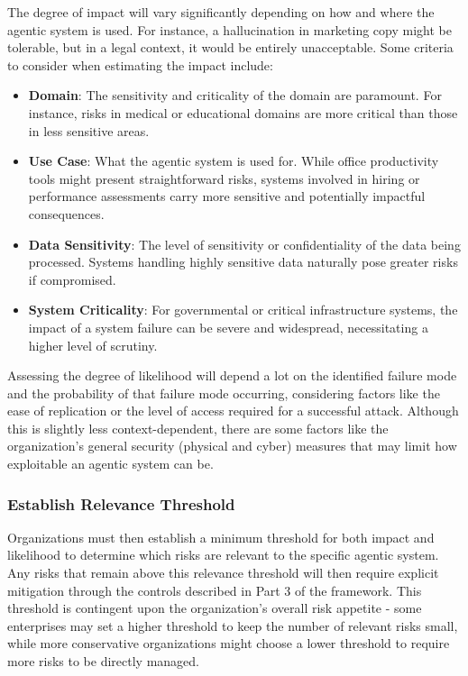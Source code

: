 \documentclass{article}
\begin{document}
The degree of impact will vary significantly depending on how and where the agentic system is used. For instance, a hallucination in marketing copy might be tolerable, but in a legal context, it would be entirely unacceptable. Some criteria to consider when estimating the impact include:

\begin{itemize}
    \item \textbf{Domain}: The sensitivity and criticality of the domain are paramount. For instance, risks in medical or educational domains are more critical than those in less sensitive areas.
    \item \textbf{Use Case}: What the agentic system is used for. While office productivity tools might present straightforward risks, systems involved in hiring or performance assessments carry more sensitive and potentially impactful consequences.
    \item \textbf{Data Sensitivity}: The level of sensitivity or confidentiality of the data being processed. Systems handling highly sensitive data naturally pose greater risks if compromised.
    \item \textbf{System Criticality}: For governmental or critical infrastructure systems, the impact of a system failure can be severe and widespread, necessitating a higher level of scrutiny.
\end{itemize}

Assessing the degree of likelihood will depend a lot on the identified failure mode and the probability of that failure mode occurring, considering factors like the ease of replication or the level of access required for a successful attack. Although this is slightly less context-dependent, there are some factors like the organization’s general security (physical and cyber) measures that may limit how exploitable an agentic system can be.

\subsubsection{Establish Relevance Threshold}

Organizations must then establish a minimum threshold for both impact and likelihood to determine which risks are relevant to the specific agentic system. Any risks that remain above this relevance threshold will then require explicit mitigation through the controls described in Part 3 of the framework. This threshold is contingent upon the organization's overall risk appetite - some enterprises may set a higher threshold to keep the number of relevant risks small, while more conservative organizations might choose a lower threshold to require more risks to be directly managed. 
\end{document}
